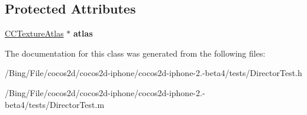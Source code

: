 \subsection*{Protected Attributes}
\begin{DoxyCompactItemize}
\item 
\hypertarget{interface_director_test_a1c25f5a5acacc234044838b16f575c9f}{\hyperlink{interface_c_c_texture_atlas}{C\-C\-Texture\-Atlas} $\ast$ {\bfseries atlas}}\label{interface_director_test_a1c25f5a5acacc234044838b16f575c9f}

\end{DoxyCompactItemize}


The documentation for this class was generated from the following files\-:\begin{DoxyCompactItemize}
\item 
/\-Bing/\-File/cocos2d/cocos2d-\/iphone/cocos2d-\/iphone-\/2.-\/beta4/tests/Director\-Test.\-h\item 
/\-Bing/\-File/cocos2d/cocos2d-\/iphone/cocos2d-\/iphone-\/2.-\/beta4/tests/Director\-Test.\-m\end{DoxyCompactItemize}
